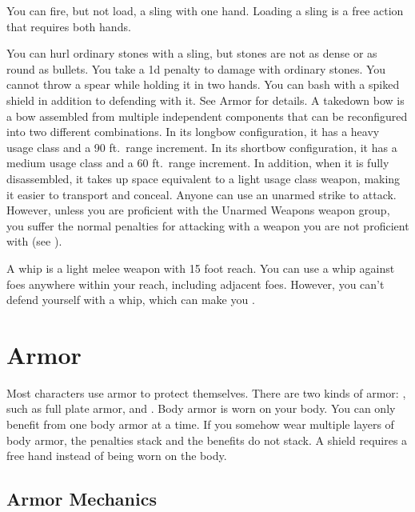          You can fire, but not load, a sling with one hand. Loading a sling is a free action that requires both hands.
        \par You can hurl ordinary stones with a sling, but stones are not as dense or as round as bullets. You take a \minus1d penalty to damage with ordinary stones.
         You cannot throw a spear while holding it in two hands.
         You can bash with a spiked shield in addition to defending with it. See Armor for details.
         A takedown bow is a bow assembled from multiple independent components that can be reconfigured into two different combinations.
        In its longbow configuration, it has a heavy usage class and a 90 ft.\ range increment.
        In its shortbow configuration, it has a medium usage class and a 60 ft.\ range increment.
        In addition, when it is fully disassembled, it takes up space equivalent to a light usage class weapon, making it easier to transport and conceal.
         Anyone can use an unarmed strike to attack.
        However, unless you are proficient with the Unarmed Weapons weapon group, you suffer the normal penalties for attacking with a weapon you are not proficient with (see ).

         A whip is a light melee weapon with 15 foot reach.
        You can use a whip against foes anywhere within your reach, including adjacent foes.
        However, you can't defend yourself with a whip, which can make you .

\section{Armor}\label{Armor}

    Most characters use armor to protect themselves. There are two kinds of armor: , such as full plate armor, and .
    Body armor is worn on your body.
    You can only benefit from one body armor at a time.
    If you somehow wear multiple layers of body armor, the penalties stack and the benefits do not stack.
    A shield requires a free hand instead of being worn on the body.

    \subsection{Armor Mechanics}

